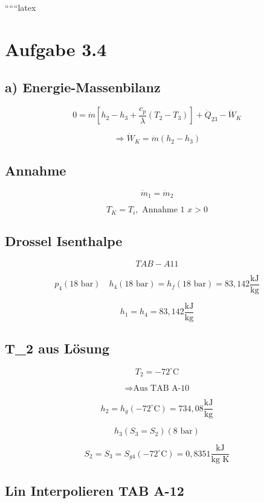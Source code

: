 
``````latex


\section*{Aufgabe 3.4}

\subsection*{a) Energie-Massenbilanz}

\[
0 = \dot{m} \left[ h_2 - h_3 + \frac{c_p}{\lambda} (T_2 - T_3) \right] + \dot{Q}_{23} - \dot{W}_K
\]

\[
\Rightarrow \dot{W}_K = \dot{m} (h_2 - h_3)
\]

\subsection*{Annahme}

\[
\dot{m}_1 = \dot{m}_2
\]

\[
T_K = T_i, \text{ Annahme 1 } x > 0
\]

\subsection*{Drossel Isenthalpe}

\[
TAB - A11
\]

\[
p_4 (18 \text{ bar}) \quad h_4 (18 \text{ bar}) = h_f (18 \text{ bar}) = 83,142 \frac{\text{kJ}}{\text{kg}}
\]

\[
h_1 = h_4 = 83,142 \frac{\text{kJ}}{\text{kg}}
\]

\subsection*{T_2 aus Lösung}

\[
T_2 = -72^\circ \text{C}
\]

\[
\Rightarrow \text{Aus TAB A-10}
\]

\[
h_2 = h_g (-72^\circ \text{C}) = 734,08 \frac{\text{kJ}}{\text{kg}}
\]

\[
h_3 (S_3 = S_2) (8 \text{ bar})
\]

\[
S_2 = S_3 = S_{g4} (-72^\circ \text{C}) = 0,8351 \frac{\text{kJ}}{\text{kg K}}
\]

\subsection*{Lin Interpolieren TAB A-12}

